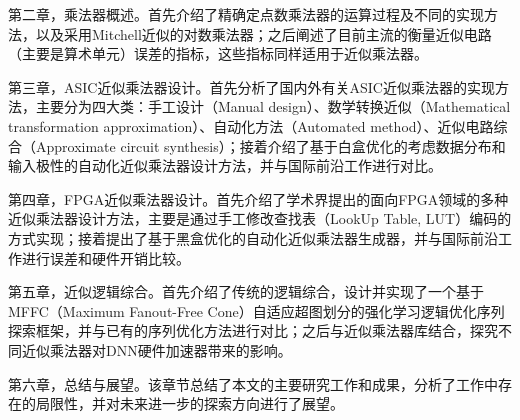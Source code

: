 第二章，乘法器概述。首先介绍了精确定点数乘法器的运算过程及不同的实现方法，以及采用Mitchell近似的对数乘法器\cite{EM:mitchell}；之后阐述了目前主流的衡量近似电路（主要是算术单元）误差的指标，这些指标同样适用于近似乘法器。

第三章，ASIC近似乘法器设计。首先分析了国内外有关ASIC近似乘法器的实现方法，主要分为四大类：手工设计（Manual design）、数学转换近似（Mathematical transformation approximation）、自动化方法（Automated method）、近似电路综合（Approximate circuit synthesis）；接着介绍了基于白盒优化的考虑数据分布和输入极性的自动化近似乘法器设计方法，并与国际前沿工作进行对比。

第四章，FPGA近似乘法器设计。首先介绍了学术界提出的面向FPGA领域的多种近似乘法器设计方法，主要是通过手工修改查找表（LookUp Table, LUT）编码的方式实现；接着提出了基于黑盒优化的自动化近似乘法器生成器，并与国际前沿工作进行误差和硬件开销比较。

第五章，近似逻辑综合。首先介绍了传统的逻辑综合，设计并实现了一个基于MFFC（Maximum Fanout-Free Cone）自适应超图划分的强化学习逻辑优化序列探索框架，并与已有的序列优化方法进行对比；之后与近似乘法器库结合，探究不同近似乘法器对DNN硬件加速器带来的影响。

第六章，总结与展望。该章节总结了本文的主要研究工作和成果，分析了工作中存在的局限性，并对未来进一步的探索方向进行了展望。

